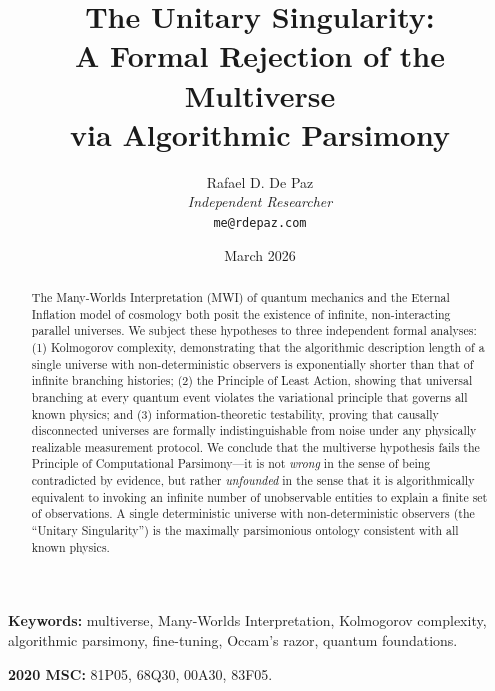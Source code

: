 \documentclass[12pt, a4paper]{article}
\theoremstyle{plain}
\theoremstyle{definition}
\theoremstyle{remark}
\begin{document}
\title{
  \textbf{The Unitary Singularity: \\
  A Formal Rejection of the Multiverse \\
  via Algorithmic Parsimony}
}
\author{
  Rafael D. De Paz \\
  \textit{Independent Researcher} \\
  \texttt{me@rdepaz.com}
}
\date{March 2026}
\maketitle

\begin{abstract}
The Many-Worlds Interpretation (MWI) of quantum mechanics and the Eternal
Inflation model of cosmology both posit the existence of infinite,
non-interacting parallel universes. We subject these hypotheses to three
independent formal analyses: (1) Kolmogorov complexity, demonstrating that
the algorithmic description length of a single universe with non-deterministic
observers is exponentially shorter than that of infinite branching histories;
(2) the Principle of Least Action, showing that universal branching at every
quantum event violates the variational principle that governs all known
physics; and (3) information-theoretic testability, proving that causally
disconnected universes are formally indistinguishable from noise under any
physically realizable measurement protocol. We conclude that the multiverse
hypothesis fails the Principle of Computational Parsimony---it is not
\emph{wrong} in the sense of being contradicted by evidence, but rather
\emph{unfounded} in the sense that it is algorithmically equivalent to
invoking an infinite number of unobservable entities to explain a finite
set of observations. A single deterministic universe with non-deterministic
observers (the ``Unitary Singularity'') is the maximally parsimonious
ontology consistent with all known physics.
\end{abstract}

\vspace{1em}
\noindent\textbf{Keywords:} multiverse, Many-Worlds Interpretation,
Kolmogorov complexity, algorithmic parsimony, fine-tuning,
Occam's razor, quantum foundations.

\vspace{0.5em}
\noindent\textbf{2020 MSC:} 81P05, 68Q30, 00A30, 83F05.
\end{document}
